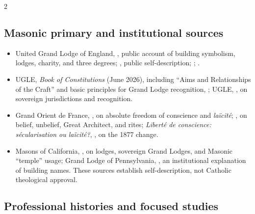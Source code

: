 \begin{multicols}{2}
\subsection*{Masonic primary and institutional sources}

{\footnotesize
\begin{itemize}[itemsep=0.1em,topsep=0.15em]
\item United Grand Lodge of England, , public account of building symbolism, lodges, charity, and three degrees; , public self-description; ; .
\item UGLE, \emph{Book of Constitutions} (June 2026), including “Aims and Relationships of the Craft” and basic principles for Grand Lodge recognition, ; UGLE, , on sovereign jurisdictions and recognition.
\item Grand Orient de France, , on absolute freedom of conscience and \emph{laïcité}; , on belief, unbelief, Great Architect, and rites; \emph{Liberté de conscience: sécularisation ou laïcité?}, , on the 1877 change.
\item Masons of California, , on lodges, sovereign Grand Lodges, and Masonic “temple” usage; Grand Lodge of Pennsylvania, , an institutional explanation of building names. These sources establish self-description, not Catholic theological approval.
\end{itemize}}

\subsection*{Professional histories and focused studies}


\end{multicols}

